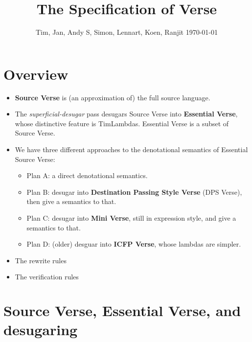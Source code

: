 \documentclass[acmsmall,screen,review]{acmart}\settopmatter{}
\begin{document}
\title{The Specification of Verse}
\author{Tim, Jan, Andy S, Simon, Lennart, Koen, Ranjit \today}
\maketitle

\section{Overview}

\begin{itemize}
\item {\bf Source Verse} is (an approximation of) the full source language.
\item The \emph{superficial-desugar} pass desugars Source Verse into {\bf Essential Verse},
  whose distinctive feature is TimLambdas.  Essential Verse is a subset of Source Verse.
\item We have three different approaches to the denotational semantics of Essential Source Verse:
  \begin{itemize}
  \item Plan A: a direct denotational semantics.
  \item Plan B: desugar into {\bf Destination Passing Style Verse} (DPS Verse), then give a semantics to that.
  \item Plan C: desugar into {\bf Mini Verse}, still in expression style, and give a semantics to that.
  \item Plan D: (older) desguar into {\bf ICFP Verse}, whose lambdas are simpler.
  \end{itemize}

\item The rewrite rules

\item The verification rules

\end{itemize}


\section{Source Verse, Essential Verse, and desugaring}




\end{document}
